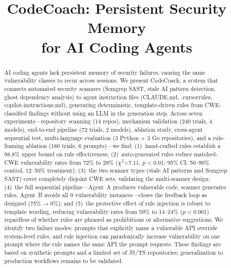 \documentclass[conference,10pt]{IEEEtran}
\begin{document}
\title{CodeCoach: Persistent Security Memory\\ for AI Coding Agents}

\author{
}

\maketitle

\begin{abstract}
AI coding agents lack persistent memory of security failures, causing the same vulnerability classes to recur across sessions. We present CodeCoach, a system that connects automated security scanners (Semgrep SAST, stale AI pattern detection, ghost dependency analysis) to agent instruction files (CLAUDE.md, .cursorrules, copilot-instructions.md), generating deterministic, template-driven rules from CWE-classified findings without using an LLM in the generation step. Across seven experiments---repository scanning (14 repos), mechanism validation (240 trials, 4 models), end-to-end pipeline (72 trials, 2 models), ablation study, cross-agent sequential test, multi-language evaluation (3 Python + 3 Go repositories), and a rule-framing ablation (180 trials, 6 prompts)---we find: (1)~hand-crafted rules establish a 98.8\% upper bound on rule effectiveness; (2)~auto-generated rules reduce matched-CWE vulnerability rates from 72\% to 28\% ($\chi^2$=7.11, $p<$0.01; 95\% CI: 50--90\% control, 12--50\% treatment); (3)~the two scanner types (stale AI patterns and Semgrep SAST) cover completely disjoint CWE sets, validating the multi-scanner design; (4)~the full sequential pipeline---Agent~A produces vulnerable code, scanner generates rules, Agent~B avoids all 9 vulnerability instances---closes the feedback loop as designed (75\%$\rightarrow$0\%); and (5)~the protective effect of rule injection is robust to template wording, reducing vulnerability rates from 59\% to 14--24\% ($p{<}0.001$) regardless of whether rules are phrased as prohibitions or alternative suggestions. We identify two failure modes: prompts that explicitly name a vulnerable API override system-level rules, and rule injection can paradoxically increase vulnerability on one prompt where the rule names the same API the prompt requests. These findings are based on synthetic prompts and a limited set of JS/TS repositories; generalization to production workflows remains to be validated.
\end{abstract}
\end{document}
